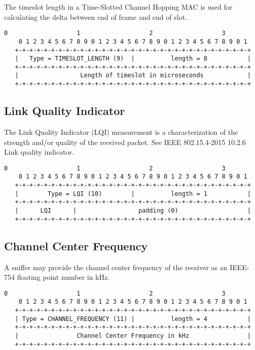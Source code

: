 \documentclass[12pt]{article}
\renewcommand\_{\textunderscore\allowbreak}
\begin{document}
The timeslot length in a Time-Slotted Channel Hopping MAC is used for
calculating the delta between end of frame and end of slot.

\begin{Verbatim}[samepage=true]
    0                   1                   2                   3
    0 1 2 3 4 5 6 7 8 9 0 1 2 3 4 5 6 7 8 9 0 1 2 3 4 5 6 7 8 9 0 1
   +-+-+-+-+-+-+-+-+-+-+-+-+-+-+-+-+-+-+-+-+-+-+-+-+-+-+-+-+-+-+-+-+
   |   Type = TIMESLOT_LENGTH (9)  |          length = 8           |
   +-+-+-+-+-+-+-+-+-+-+-+-+-+-+-+-+-+-+-+-+-+-+-+-+-+-+-+-+-+-+-+-+
   |                 Length of timeslot in microseconds            |
   +-+-+-+-+-+-+-+-+-+-+-+-+-+-+-+-+-+-+-+-+-+-+-+-+-+-+-+-+-+-+-+-+
\end{Verbatim}

\subsection{Link Quality Indicator}

The Link Quality Indicator (LQI) measurement is a characterization of the
strength and/or quality of the received packet.  See IEEE 802.15.4-2015 10.2.6
Link quality indicator.

\begin{Verbatim}[samepage=true]
    0                   1                   2                   3
    0 1 2 3 4 5 6 7 8 9 0 1 2 3 4 5 6 7 8 9 0 1 2 3 4 5 6 7 8 9 0 1
   +-+-+-+-+-+-+-+-+-+-+-+-+-+-+-+-+-+-+-+-+-+-+-+-+-+-+-+-+-+-+-+-+
   |        Type = LQI (10)        |          length = 1           |
   +-+-+-+-+-+-+-+-+-+-+-+-+-+-+-+-+-+-+-+-+-+-+-+-+-+-+-+-+-+-+-+-+
   |      LQI      |                 padding (0)                   |
   +-+-+-+-+-+-+-+-+-+-+-+-+-+-+-+-+-+-+-+-+-+-+-+-+-+-+-+-+-+-+-+-+
\end{Verbatim}

\subsection{Channel Center Frequency}

A sniffer may provide the channel center frequency of the receiver
as an IEEE-754 floating point number in kHz.

\begin{Verbatim}[samepage=true]
    0                   1                   2                   3
    0 1 2 3 4 5 6 7 8 9 0 1 2 3 4 5 6 7 8 9 0 1 2 3 4 5 6 7 8 9 0 1
   +-+-+-+-+-+-+-+-+-+-+-+-+-+-+-+-+-+-+-+-+-+-+-+-+-+-+-+-+-+-+-+-+
   | Type = CHANNEL_FREQUENCY (11) |          length = 4           |
   +-+-+-+-+-+-+-+-+-+-+-+-+-+-+-+-+-+-+-+-+-+-+-+-+-+-+-+-+-+-+-+-+
   |                Channel Center Frequency in kHz                |
   +-+-+-+-+-+-+-+-+-+-+-+-+-+-+-+-+-+-+-+-+-+-+-+-+-+-+-+-+-+-+-+-+
\end{Verbatim}
\end{document}
